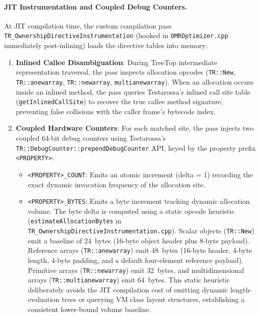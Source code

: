\documentclass[12pt,a4paper]{article}
\begin{document}
\paragraph{JIT Instrumentation and Coupled Debug Counters.}
At JIT compilation time, the custom compilation pass \texttt{TR\_OwnershipDirectiveInstrumentation} (hooked in \texttt{OMROptimizer.cpp} immediately post-inlining) loads the directive tables into memory:
\begin{enumerate}[leftmargin=*]
  \item \textbf{Inlined Callee Disambiguation}: During TreeTop intermediate representation traversal, the pass inspects allocation opcodes (\texttt{TR::New}, \texttt{TR::anewarray}, \texttt{TR::newarray}, \texttt{multianewarray}). When an allocation occurs inside an inlined method, the pass queries Testarossa's inlined call site table (\texttt{getInlinedCallSite}) to recover the true callee method signature, preventing false collisions with the caller frame's bytecode index.
  \item \textbf{Coupled Hardware Counters}: For each matched site, the pass injects two coupled 64-bit debug counters using Testarossa's \texttt{TR::DebugCounter::prependDebugCounter} API, keyed by the property prefix \texttt{<PROPERTY>}:
  \begin{itemize}
    \item \texttt{<PROPERTY>\_COUNT}: Emits an atomic increment (delta = 1) recording the exact dynamic invocation frequency of the allocation site.
    \item \texttt{<PROPERTY>\_BYTES}: Emits a byte increment tracking dynamic allocation volume. The byte delta is computed using a static opcode heuristic (\texttt{estimateAllocationBytes} in \texttt{TR\_}\allowbreak\texttt{Ownership}\allowbreak\texttt{Directive}\allowbreak\texttt{Instrumentation.cpp}). Scalar objects (\texttt{TR::New}) emit a baseline of 24~bytes (16-byte object header plus 8-byte payload). Reference arrays (\texttt{TR::anewarray}) emit 48~bytes (16-byte header, 4-byte length, 4-byte padding, and a default four-element reference payload). Primitive arrays (\texttt{TR::newarray}) emit 32~bytes, and multidimensional arrays (\texttt{TR::multianewarray}) emit 64~bytes. This static heuristic deliberately avoids the JIT compilation cost of emitting dynamic length-evaluation trees or querying VM class layout structures, establishing a consistent lower-bound volume baseline.
  \end{itemize}
\end{enumerate}
\end{document}
